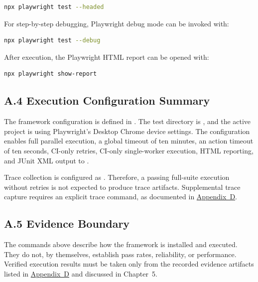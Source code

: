 \begin{lstlisting}[language=bash]
npx playwright test --headed
\end{lstlisting}

For step-by-step debugging, Playwright debug mode can be invoked with:

\begin{lstlisting}[language=bash]
npx playwright test --debug
\end{lstlisting}

After execution, the Playwright HTML report can be opened with:

\begin{lstlisting}[language=bash]
npx playwright show-report
\end{lstlisting}

\subsection*{A.4 Execution Configuration Summary}

The framework configuration is defined in . The test directory is , and the active project is  using Playwright's Desktop Chrome device settings. The configuration enables full parallel execution, a global timeout of ten minutes, an action timeout of ten seconds, CI-only retries, CI-only single-worker execution, HTML reporting, and JUnit XML output to .

Trace collection is configured as . Therefore, a passing full-suite execution without retries is not expected to produce trace artifacts. Supplemental trace capture requires an explicit trace command, as documented in \hyperref[app:sample-reports]{Appendix~D}.

\subsection*{A.5 Evidence Boundary}

The commands above describe how the framework is installed and executed. They do not, by themselves, establish pass rates, reliability, or performance. Verified execution results must be taken only from the recorded evidence artifacts listed in \hyperref[app:sample-reports]{Appendix~D} and discussed in Chapter~5.

\endgroup
